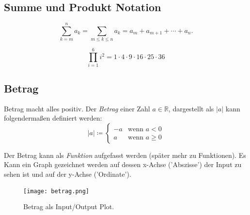 %     

\subsection{Summe und Produkt Notation}

\begin{equation}
{\displaystyle \sum _{k=m}^{n}a_{k}=\sum _{m\leq k\leq n}a_{k}=a_{m}+a_{m+1}+\dotsb +a_{n}.}
\end{equation}



\begin{equation}
{\displaystyle \prod _{i=1}^{6}i^{2} =  1\cdot 4\cdot 9\cdot 16\cdot 25\cdot 36}
\end{equation}


\subsection{Betrag}


Betrag macht alles positiv. Der \emph{Betrag} einer Zahl $a \in \mathbb{R}$, dargestellt als $|a|$ kann folgendermaßen definiert werden:
$$ 
|a| \coloneqq
\begin{cases} 
-a & \text{wenn } a < 0 \\ 
a & \text{wenn } a \geq 0 
\end{cases}
$$ 

Der Betrag kann als \emph{Funktion} aufgefasst werden (später mehr zu Funktionen). Es Kann ein Graph gezeichnet werden auf dessen x-Achse ('Abszisse') der Input zu sehen ist und auf der y-Achse ('Ordinate'). 



\begin{figure}[h!]
    \centering
    \texttt{[image: betrag.png]}
    \caption{Betrag als Input/Output Plot.}
    \label{fig:betrag}
\end{figure}


